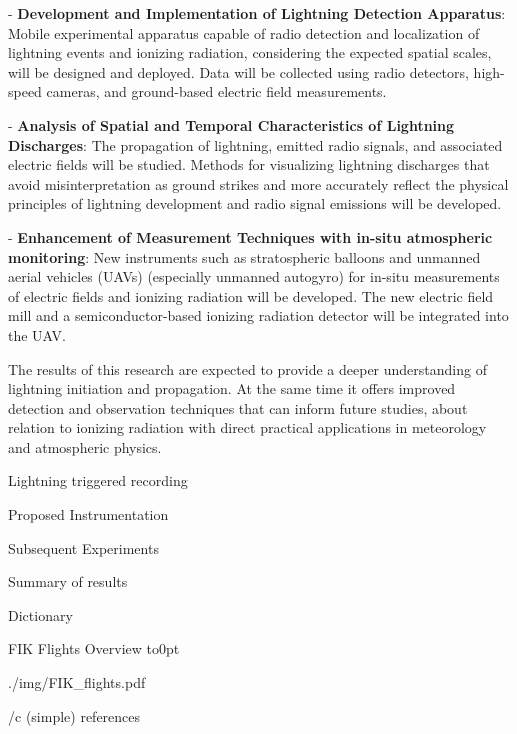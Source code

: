 \begitems
\item - {\bf Development and Implementation of Lightning Detection Apparatus}: Mobile experimental apparatus capable of radio detection and localization of lightning events and ionizing radiation, considering the expected spatial scales, will be designed and deployed. Data will be collected using radio detectors, high-speed cameras, and ground-based electric field measurements.
\item - {\bf Analysis of Spatial and Temporal Characteristics of Lightning Discharges}: The propagation of lightning, emitted radio signals, and associated electric fields will be studied. Methods for visualizing lightning discharges that avoid misinterpretation as ground strikes and more accurately reflect the physical principles of lightning development and radio signal emissions will be developed.
\item - {\bf Enhancement of Measurement Techniques with in-situ atmospheric monitoring}: New instruments such as stratospheric balloons and unmanned aerial vehicles (UAVs) (especially unmanned autogyro) for in-situ measurements of electric fields and ionizing radiation will be developed. The new electric field mill and a semiconductor-based ionizing radiation detector will be integrated into the UAV.
\enditems

The results of this research are expected to provide a deeper understanding of lightning initiation and propagation. At the same time it offers improved detection and observation techniques that can inform future studies, about relation to ionizing radiation with direct practical applications in meteorology and atmospheric physics.

 

 Lightning triggered recording 

 

\chap[instrumentation] Proposed Instrumentation

 

\chap[experiments] Subsequent Experiments

 

\chap[results] Summary of results

 

\app Dictionary
\makeglos

 FIK Flights Overview
\vbox to0pt{\vskip-25mm\centerline{\inspic ./img/FIK_flights.pdf }\vss}
\nextoddpage

\bibchap
\usebib/c (simple) references

\bye
